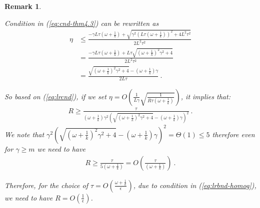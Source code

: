 \documentclass[sigconf, anonymous, review]{acmart}
\newtheorem{remark}{Remark}
\begin{document}
\begin{remark}\label{rmk:cnd-lr}

Condition in (\ref{eq:cnd-thm4.3}) can be rewritten as 
\begin{align}
    \eta&\leq \frac{-\gamma L\tau\left(\omega+\frac{1}{k}\right)+\sqrt{\gamma^2 \left(L\tau\left(\omega+\frac{1}{k}\right)\right)^2+4L^2\tau^2}}{2L^2\tau^2}\nonumber\\
    &= \frac{-\gamma L\tau\left(\omega+\frac{1}{k}\right)+L\tau\sqrt{\left(\omega+\frac{1}{k}\right)^2\gamma^2 +4}}{2L^2\tau^2}\nonumber\\
    &=\frac{\sqrt{\left(\omega+\frac{1}{k}\right)^2\gamma^2 +4}-\left(\omega+\frac{1}{k}\right)\gamma}{2L\tau} \ . \label{eq:lrcnd}
\end{align}

So based on (\ref{eq:lrcnd}), if we set $\eta=O\left(\frac{1}{L\gamma}\sqrt{\frac{1}{R\tau\left(\omega+\frac{1}{k}\right)}}\right)$, it implies that:
\begin{align}
    R\geq \frac{\tau }{\left(\omega+\frac{1}{k}\right)\gamma^2\left(\sqrt{\left(\omega+\frac{1}{k}\right)^2\gamma^2+4}-\left(\omega+\frac{1}{k}\right)\gamma\right)^2} \ . \label{eq:iidexact}
\end{align}
We note that $\gamma^2\left(\sqrt{\left(\omega+\frac{1}{k}\right)^2\gamma^2+4}-\left(\omega+\frac{1}{k}\right)\gamma\right)^2=\Theta(1)\leq 5 $ therefore even for $\gamma\geq m$ we need to have 
\begin{align}
    R\geq \frac{\tau }{5\left(\omega+\frac{1}{k}\right)}=O\left(\frac{\tau }{\left(\omega+\frac{1}{k}\right)}\right)\label{eq:lrbnd-homog} \ .
\end{align}

Therefore, for the choice of $\tau=O\left(\frac{\omega+\frac{1}{k}}{\epsilon}\right)$, due to condition in (\ref{eq:lrbnd-homog}), we need to have $R=O\left(\frac{1}{\epsilon}\right)$. %


\end{remark}
\end{document}
